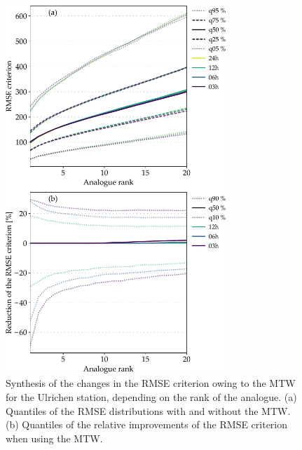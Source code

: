 \documentclass[hess, manuscript]{copernicus}
\begin{document}
	\begin{figure}[htb]
		\begin{center}
			\includegraphics[width=8.3cm]{fig08.pdf}
		\end{center}
		\caption{Synthesis of the changes in the RMSE criterion owing to the MTW for the Ulrichen station, depending on the rank of the analogue. (a) Quantiles of the RMSE distributions with and without the MTW. (b) Quantiles of the relative improvements of the RMSE criterion when using the MTW.}
		\label{fig:changes_RMSE}
	\end{figure}
	
\end{document}
